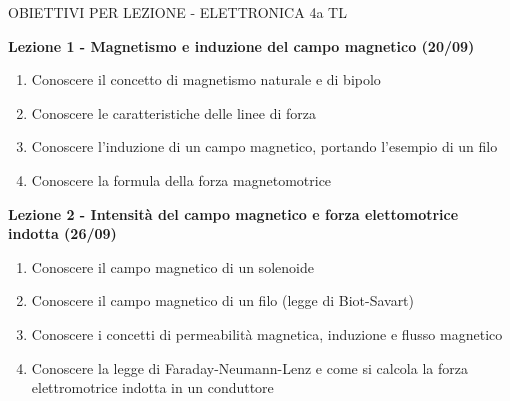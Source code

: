 \documentclass{article}
\begin{document}
	\begin{center}
		\begin{huge}
			OBIETTIVI PER LEZIONE - ELETTRONICA 4a TL
		\end{huge}
	\end{center}

	\begin{center}
	\end{center}

	\begin{center}
		\textbf{Lezione 1 - Magnetismo e induzione del campo magnetico (20/09)}
	\end{center}
	\begin{enumerate}
		\item Conoscere il concetto di magnetismo naturale e di bipolo
		\item Conoscere le caratteristiche delle linee di forza
		\item Conoscere l'induzione di un campo magnetico, portando l'esempio di un filo
		\item Conoscere la formula della forza magnetomotrice
	\end{enumerate}

	\begin{center}
		\textbf{Lezione 2 - Intensità del campo magnetico e forza elettomotrice indotta (26/09)}
		\begin{enumerate}
			\item Conoscere il campo magnetico di un solenoide
			\item Conoscere il campo magnetico di un filo (legge di Biot-Savart)
			\item Conoscere i concetti di permeabilità magnetica, induzione e flusso magnetico
			\item Conoscere la legge di Faraday-Neumann-Lenz e come si calcola la forza elettromotrice indotta in un conduttore
		\end{enumerate}
	\end{center}
\end{document}
